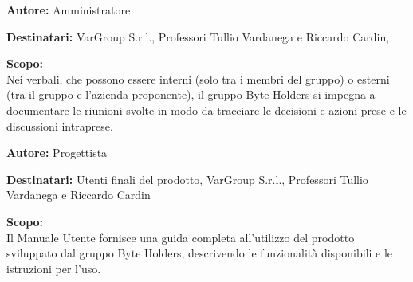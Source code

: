 \documentclass[a4paper, 11pt]{article}
\begin{document}

\begin{tcolorbox}[
    colback=LightGray,       %
    colframe=AccentColor,    %
    coltitle=white,          %
    fonttitle=\bfseries\large,
    boxrule=0.5mm,           %
    arc=2mm,                 %
    title={Verbali} %
]
    \textbf{\textcolor{AccentDark}{Autore:}} Amministratore  %
    
    \vspace{0.2cm} %
    \textbf{\textcolor{AccentDark}{Destinatari:}} VarGroup S.r.l., Professori Tullio Vardanega e Riccardo Cardin, 

    \vspace{0.2cm} %

    \textbf{\textcolor{AccentDark}{Scopo:}} \\
    Nei verbali, che possono essere interni (solo tra i membri del gruppo) o esterni (tra il gruppo e l'azienda proponente), il gruppo Byte Holders si impegna a documentare le riunioni svolte in modo da tracciare le decisioni e azioni prese e le discussioni intraprese.

\end{tcolorbox}

\begin{tcolorbox}[
    colback=LightGray,
    colframe=AccentColor,
    coltitle=white,
    fonttitle=\bfseries\large,
    boxrule=0.5mm,
    arc=2mm,
    title={Manuale Utente}
]
    \textbf{\textcolor{AccentDark}{Autore:}} Progettista

    \vspace{0.2cm}
    \textbf{\textcolor{AccentDark}{Destinatari:}} Utenti finali del prodotto, VarGroup S.r.l., Professori Tullio Vardanega e Riccardo Cardin

    \vspace{0.2cm}
    \textbf{\textcolor{AccentDark}{Scopo:}} \\
    Il Manuale Utente fornisce una guida completa all'utilizzo del prodotto sviluppato dal gruppo Byte Holders, descrivendo le funzionalità disponibili e le istruzioni per l'uso.
\end{tcolorbox}
\end{document}
